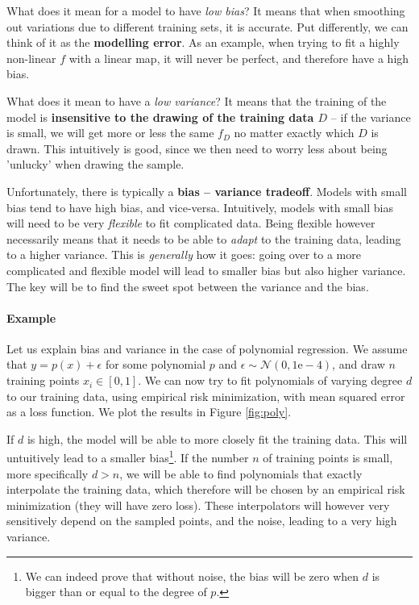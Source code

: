 \documentclass{article}
\begin{document}
What does it mean for a model to have \emph{low bias}? It means that when smoothing out variations due to different training sets, it is accurate. Put differently, we can think of it as the \textbf{modelling error}. As an example, when trying to fit a highly non-linear $f$ with a linear map, it will never be perfect, and therefore have a high bias. 

What does it mean to have a \emph{low variance}? It means that the training of the model is \textbf{insensitive to the drawing of the training data $D$} -- if the variance is small, we will get more or less the same $f_D$ no matter exactly which $D$ is drawn. This intuitively is good, since we then need to worry less about being 'unlucky' when drawing the sample.

Unfortunately, there is typically a \textbf{bias -- variance  tradeoff}. Models with small bias tend to have high bias, and vice-versa. Intuitively, models with small bias will need to be very \emph{flexible} to fit complicated data. Being flexible however necessarily means that it needs to be able to \emph{adapt} to the training data, leading to a higher variance. This is \emph{generally} how it goes: going over to a more complicated and flexible model will lead to smaller bias but also higher variance. The key will be to find the sweet spot between the variance and the bias.

\paragraph{Example} Let us explain bias and variance in the case of polynomial regression. We assume that $y=p(x)+\epsilon$ for some polynomial $p$ and $\epsilon \sim \mathcal{N}(0,1\mathrm{e-4})$, and draw $n$ training points $x_i \in [0,1]$. We can now try to fit polynomials of varying degree $d$ to our training data, using empirical risk minimization, with mean squared error as a loss function. We plot the results in Figure \ref{fig:poly}.

If $d$ is high, the model will be able to more closely fit the training data. This will untuitively lead to a smaller bias\footnote{We can indeed prove that without noise, the bias will be zero when $d$ is bigger than or equal to the degree of $p$.}. If the number $n$ of training points is small, more specifically $d>n$, we will be able to find polynomials that exactly interpolate the training data, which therefore will be chosen by an empirical risk minimization (they will have zero loss). These interpolators will however very sensitively depend on the sampled points, and the noise, leading to a very high variance.
\end{document}
